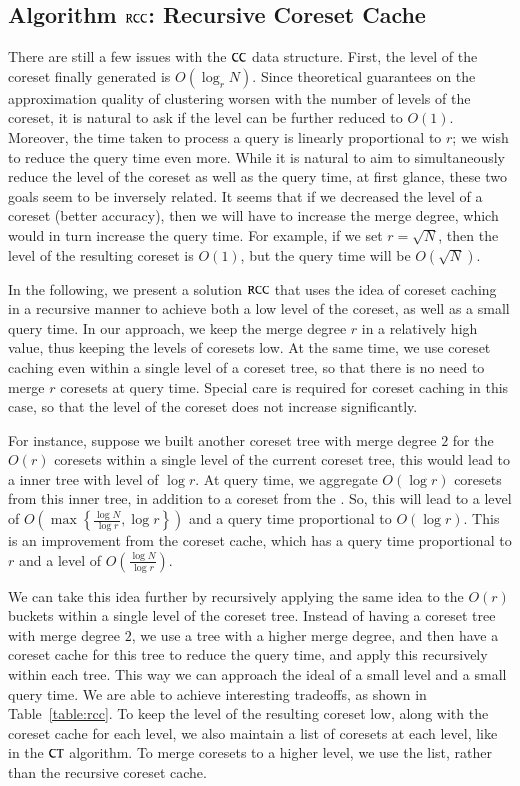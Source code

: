 \subsection{Algorithm $\texttt{RCC}$: Recursive Coreset Cache}
\newcommand{\rmax}{\rho}
\newcommand{\order}{\texttt{order}}
\newcommand{\mainds}{\mathcal{R}}

There are still a few issues with the $\texttt{CC}$ data structure. First, the level of
the coreset finally generated is $O(\log_rN)$. Since theoretical guarantees on
the approximation quality of clustering worsen with the number of levels of the
coreset, it is natural to ask if the level can be further reduced to $O(1)$.
Moreover, the time taken to process a query is linearly proportional to $r$; we
wish to reduce the query time even more.  While it is natural to aim to
simultaneously reduce the level of the coreset as well as the query time, at
first glance, these two goals seem to be inversely related. It seems that if we
decreased the level of a coreset (better accuracy), then we will have to
increase the merge degree, which would in turn increase the query time. For
example, if we set $r=\sqrt{N}$, then the level of the resulting coreset is
$O(1)$, but the query time will be $O(\sqrt{N})$.

In the following, we present a solution $\texttt{RCC}$ that uses the idea of coreset
caching in a recursive manner to achieve both a low level of the coreset, as
well as a small query time. In our approach, we keep the merge degree $r$ 
in a relatively high value, thus keeping the levels of coresets low. 
At the same time, we use coreset caching even within a single level of a coreset tree, 
so that there is no need to merge $r$ coresets at query time. 
Special care is required for coreset caching in this case, 
so that the level of the coreset does not increase significantly.

For instance, suppose we built another coreset tree with merge degree $2$ for
the $O(r)$ coresets within a single level of the current coreset tree, this
would lead to a inner tree with level of $\log r$. At query time, we aggregate
$O(\log r)$ coresets from this inner tree, in addition to a coreset from the \cc. So, this will lead to a level of $O\left(\max\left\{\frac{\log N}{\log r}, \log r\right \}\right)$ and a query time proportional to $O(\log r)$. This is an improvement from the coreset cache, which has a query time proportional to $r$ and a level of $O\left(\frac{\log N}{\log r}\right)$.

We can take this idea further by recursively applying the same idea to the
$O(r)$ buckets within a single level of the coreset tree. Instead of having a
coreset tree with merge degree $2$, we use a tree with a higher merge degree,
and then have a coreset cache for this tree to reduce the query time, and apply
this recursively within each tree. This way we can approach the ideal of a small
level and a small query time. We are able to achieve interesting tradeoffs, as
shown in Table~\ref{table:rcc}. To keep the level of the resulting coreset low,
along with the coreset cache for each level, we also maintain a list of coresets
at each level, like in the $\texttt{CT}$ algorithm. To merge coresets to a higher level,
we use the list, rather than the recursive coreset cache.

